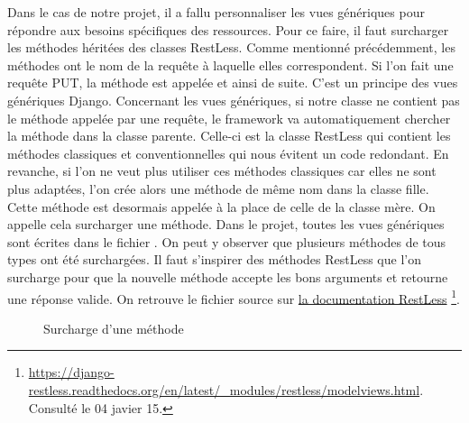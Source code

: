 \documentclass[a4paper,10pt,twoside]{sphinxmanual}
\begin{document}
Dans le cas de notre projet, il a fallu personnaliser les vues génériques pour répondre aux besoins spécifiques des ressources. Pour ce faire, il faut surcharger les méthodes héritées des classes RestLess. Comme mentionné précédemment, les méthodes ont le nom de la requête à laquelle elles correspondent. Si l'on fait une requête PUT, la méthode  est appelée et ainsi de suite. C'est un principe des vues génériques Django. Concernant les vues génériques, si notre classe ne contient pas le méthode appelée par une requête, le framework va automatiquement chercher la méthode dans la classe parente. Celle-ci est la classe RestLess qui contient les méthodes classiques et conventionnelles qui nous évitent un code redondant. En revanche, si l'on ne veut plus utiliser ces méthodes classiques car elles ne sont plus adaptées, l'on crée alors une méthode de même nom dans la classe fille. Cette méthode est desormais appelée à la place de celle de la classe mère. On appelle cela surcharger une méthode. Dans le projet, toutes les vues génériques sont écrites dans le fichier . On peut y observer que plusieurs méthodes de tous types ont été surchargées. Il faut s'inspirer des méthodes RestLess que l'on surcharge pour que la nouvelle méthode accepte les bons arguments et retourne une réponse valide. On retrouve le fichier source sur \href{https://django-restless.readthedocs.org/en/latest/\_modules/restless/modelviews.html}{la documentation RestLess} \footnote{
\href{https://django-restless.readthedocs.org/en/latest/\_modules/restless/modelviews.html}{https://django-restless.readthedocs.org/en/latest/\_modules/restless/modelviews.html}. Consulté le 04 javier 15.
}.
\begin{figure}[htbp]
\centering
\capstart

\caption{Surcharge d'une méthode}\end{figure}
\end{document}
